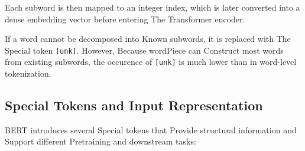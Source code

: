 Each subword is then mapped to an integer index, which is later converted into a dense embedding vector before entering The Transformer encoder.

If a word cannot be decomposed into Known subwords, it is replaced with The Special token \texttt{[unk]}. However, Because wordPiece can Construct most words from existing subwords, the occurence of \texttt{[unk]} is much lower than in word-level tokenization.

\subsection{Special Tokens and Input Representation}

BERT introduces several Special tokens that Provide structural information and Support different Pretraining and downstream tasks:

